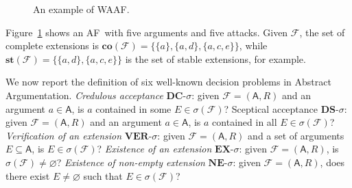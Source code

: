 \documentclass[conference]{IEEEtran}
\newcommand{\AF}{\ensuremath{\mathcal{F}}\xspace} %
\newcommand{\F}{\ensuremath{\mathcal{F}}\xspace} %
\newcommand{\args}{\ensuremath{\mathsf{A}}\xspace} %
\newcommand{\atts}{\ensuremath{R}\xspace}
\newcommand{\AFC}{\ensuremath{\AF=(\args,\atts)}\xspace} %
\newcommand{\af}{AF}
\newcommand{\co}{\mathbf{co}}
\newcommand{\st}{\mathbf{st}}
\newcommand{\dc}{\mathbf{DC}}
\newcommand{\ds}{\mathbf{DS}}
\newcommand{\ex}{\mathbf{EX}}
\newcommand{\nem}{\mathbf{NE}}
\begin{document}
\begin{figure}[t]
	\centering
	\vspace{-0.3cm}
	\caption{An example of  WAAF.}\label{fig:argnetex}
\end{figure}


Figure~\ref{fig:argnetex} shows an \af \, with five arguments and five attacks. Given $\F$, the set of complete extensions is $\co(\F) = \{\{a\}, \{a,d\}, \{a, c,e\}\}$, while $\st(\F) = \{\{a,d\}, \{a, c,e\}\}$ is the set of stable extensions, for example. %



We  now report  the definition of six well-known decision problems in Abstract Argumentation.
\emph{Credulous acceptance} $\dc\textit{-}\sigma$: given \AFC and an argument $a \in \args$, is $a$ contained in some $E \in \sigma(\F)$?
Sceptical acceptance $\ds\textit{-}\sigma$: given \AFC and an argument $a \in \args$, is $a$ contained in all $E \in \sigma(\F)$?
\emph{Verification of an extension} $\mathit{\textbf{VER}}\textit{-}\sigma$: given \AFC and a set of arguments $E \subseteq \args$, is $E \in \sigma(\F)$?
\emph{Existence of an extension} $\ex\textit{-}\sigma$: given \AFC, is
$\sigma(\F) \not= \varnothing$?
\emph{Existence of non-empty extension}
$\nem\textit{-}\sigma$: given \AFC, does there exist $E
\not= \varnothing$ such that $E \in \sigma(\F)$?
\end{document}
